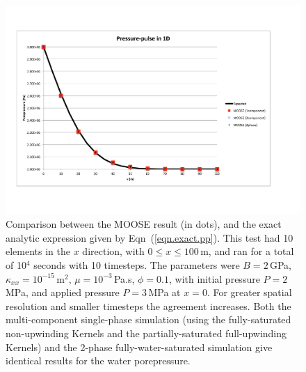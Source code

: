 \begin{figure}[htb]
\centering
\includegraphics[width=15cm]{pressure_pulse_1d.pdf}
\caption{Comparison between the MOOSE result (in dots), and the exact
  analytic expression given by Eqn~(\ref{eqn.exact.pp}).  This test
  had 10 elements in the $x$ direction, with $0\leq x \leq 100$\,m,
  and ran for a total of 10$^4$ seconds with 10 timesteps.  The
  parameters were $B=2$\,GPa, $\kappa_{xx}=10^{-15}$\,m$^{2}$,
  $\mu=10^{-3}$\,Pa.s, $\phi=0.1$, with initial pressure $P=2$\,MPa,
  and applied pressure $P=3$\,MPa at $x=0$.  For greater spatial
  resolution and smaller timesteps the agreement increases.  Both the
  multi-component single-phase simulation (using the fully-saturated
  non-upwinding Kernels and the partially-saturated full-upwinding
  Kernels) and the 2-phase fully-water-saturated simulation give
  identical results for the water porepressure.}
\label{pressure_pulse.fig}
\end{figure}

